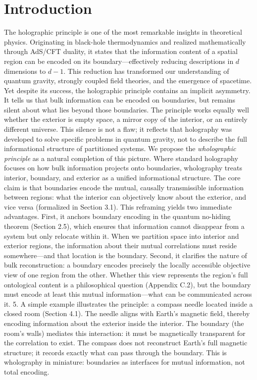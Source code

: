 ﻿\documentclass[12pt]{article}
\begin{document}
\section{Introduction}
The holographic principle is one of the most remarkable insights in theoretical physics. Originating in black-hole thermodynamics and realized mathematically through AdS/CFT duality, it states that the information content of a spatial region can be encoded on its boundary---effectively reducing descriptions in $d$ dimensions to $d-1$. This reduction has transformed our understanding of quantum gravity, strongly coupled field theories, and the emergence of spacetime.
Yet despite its success, the holographic principle contains an implicit asymmetry. It tells us that bulk information can be encoded on boundaries, but remains silent about what lies beyond those boundaries. The principle works equally well whether the exterior is empty space, a mirror copy of the interior, or an entirely different universe. This silence is not a flaw; it reflects that holography was developed to solve specific problems in quantum gravity, not to describe the full informational structure of partitioned systems.
We propose the \emph{wholographic principle} as a natural completion of this picture. Where standard holography focuses on how bulk information projects onto boundaries, wholography treats interior, boundary, and exterior as a unified informational structure. The core claim is that boundaries encode the mutual, causally transmissible information between regions: what the interior can objectively know about the exterior, and vice versa (formalized in Section 3.1).
This reframing yields two immediate advantages. First, it anchors boundary encoding in the quantum no-hiding theorem (Section 2.5), which ensures that information cannot disappear from a system but only relocate within it. When we partition space into interior and exterior regions, the information about their mutual correlations must reside somewhere---and that location is the boundary.  Second, it clarifies the nature of bulk reconstruction: a boundary encodes precisely the locally accessible objective view of one region from the other. Whether this view represents the region’s full ontological content is a philosophical question (Appendix C.2), but the boundary must encode at least this mutual information—what can be communicated across it.
5.
A simple example illustrates the principle: a compass needle located inside a closed room (Section 4.1). The needle aligns with Earth’s magnetic field, thereby encoding information about the exterior inside the interior. The boundary (the room’s walls) mediates this interaction: it must be magnetically transparent for the correlation to exist. The compass does not reconstruct Earth’s full magnetic structure; it records exactly what can pass through the boundary. This is wholography in miniature: boundaries as interfaces for mutual information, not total encoding.
\end{document}
